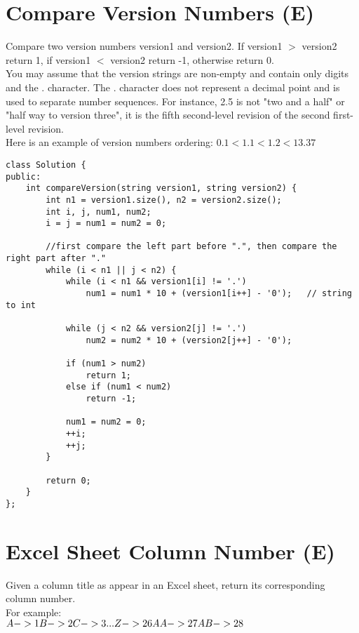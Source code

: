 \section{Compare Version Numbers (E)}
Compare two version numbers version1 and version2. If version1 $>$ version2 return 1, if version1 $<$ version2 return -1, otherwise return 0.\\

You may assume that the version strings are non-empty and contain only digits and the . character.
The . character does not represent a decimal point and is used to separate number sequences.
For instance, 2.5 is not "two and a half" or "half way to version three", it is the fifth second-level revision of the second first-level revision.\\

Here is an example of version numbers ordering: $0.1 < 1.1 < 1.2 < 13.37$\\

\begin{lstlisting}
class Solution {
public:
    int compareVersion(string version1, string version2) {
        int n1 = version1.size(), n2 = version2.size();
        int i, j, num1, num2;
        i = j = num1 = num2 = 0;
        
        //first compare the left part before ".", then compare the right part after "."
        while (i < n1 || j < n2) {
            while (i < n1 && version1[i] != '.')
                num1 = num1 * 10 + (version1[i++] - '0');   // string to int

            while (j < n2 && version2[j] != '.')
                num2 = num2 * 10 + (version2[j++] - '0');
            
            if (num1 > num2)
                return 1;
            else if (num1 < num2)
                return -1;
            
            num1 = num2 = 0;
            ++i;
            ++j;
        }
        
        return 0;
    }
};
\end{lstlisting}


\section{Excel Sheet Column Number (E)}
Given a column title as appear in an Excel sheet, return its corresponding column number.\\

For example:\\
$
    A -> 1 \\
    B -> 2 \\
    C -> 3 \\
    ... \\
    Z -> 26\\
    AA -> 27\\
    AB -> 28 $\\

